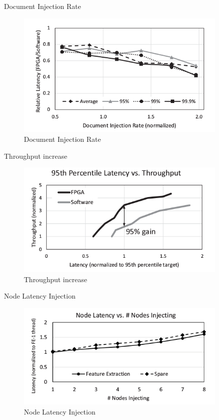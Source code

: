\documentclass[t]{beamer}
\begin{document}
\begin{frame}{Document Injection Rate}
    \begin{figure}
        \includegraphics[width=4in]{img/document-injection-rate.png}
        \caption{Document Injection Rate}
    \end{figure}
\end{frame}

\begin{frame}{Throughput increase}
    \begin{figure}
        \includegraphics[width=4in]{img/throughput-increase.png}
        \caption{Throughput increase}
    \end{figure}
\end{frame}

\begin{frame}{Node Latency Injection}
    \begin{figure}
        \includegraphics[width=4in]{img/node-latency-injection.png}
        \caption{Node Latency Injection}
    \end{figure}
\end{frame}
\end{document}
